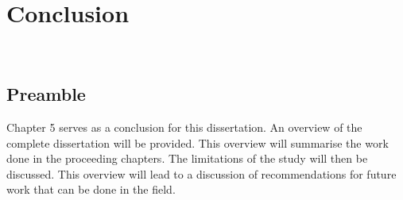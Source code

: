 \chapter{Conclusion}
\thispagestyle{empty}
\vspace{40em}
\hrulefill
\\
\newpage
		\section{Preamble}
		Chapter 5 serves as a conclusion for this dissertation. An overview of the complete dissertation will be provided. This overview will summarise the work done in the proceeding chapters. The limitations of the study will then be discussed. This overview will lead to a discussion of recommendations for future work that can be done in the field.
